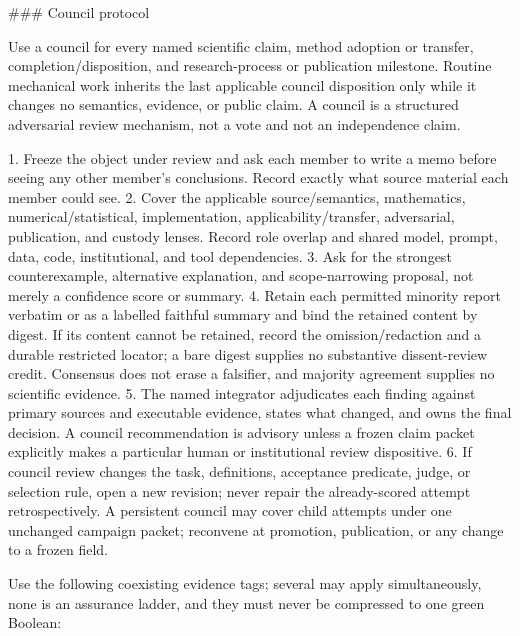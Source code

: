\documentclass[11pt]{article}
\begin{document}
\begin{markdown}
### Council protocol

Use a council for every named scientific claim, method adoption or transfer, completion/disposition,
and research-process or publication milestone. Routine mechanical work inherits the last applicable
council disposition only while it changes no semantics, evidence, or public claim. A council is a
structured adversarial review mechanism, not a vote and not an independence claim.

1. Freeze the object under review and ask each member to write a memo before seeing any other
   member's conclusions. Record exactly what source material each member could see.
2. Cover the applicable source/semantics, mathematics, numerical/statistical, implementation,
   applicability/transfer, adversarial, publication, and custody lenses. Record role overlap and
   shared model, prompt, data, code, institutional, and tool dependencies.
3. Ask for the strongest counterexample, alternative explanation, and scope-narrowing proposal,
   not merely a confidence score or summary.
4. Retain each permitted minority report verbatim or as a labelled faithful summary and bind the
   retained content by digest. If its content cannot be retained, record the omission/redaction and
   a durable restricted locator; a bare digest supplies no substantive dissent-review credit.
   Consensus does not erase a falsifier, and majority agreement supplies no scientific evidence.
5. The named integrator adjudicates each finding against primary sources and executable evidence,
   states what changed, and owns the final decision. A council recommendation is advisory unless a
   frozen claim packet explicitly makes a particular human or institutional review dispositive.
6. If council review changes the task, definitions, acceptance predicate, judge, or selection rule,
   open a new revision; never repair the already-scored attempt retrospectively. A persistent
   council may cover child attempts under one unchanged campaign packet; reconvene at promotion,
   publication, or any change to a frozen field.

Use the following coexisting evidence tags; several may apply simultaneously, none is an assurance
ladder, and they must never be compressed to one green Boolean:


\end{markdown}
\end{document}
